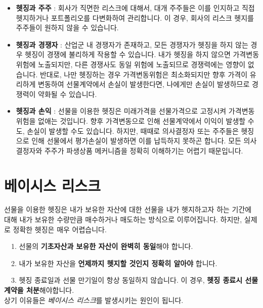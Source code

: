 \documentclass[
  letterpaper,
  DIV=11,
  numbers=noendperiod]{scrreprt}
\begin{document}
\begin{itemize}
\item
  \textbf{헷징과 주주} : 회사가 직면한 리스크에 대해서, 대개 주주들은
  이를 인지하고 직접 헷지하거나 포트폴리오를 다변화하여 관리합니다. 이
  경우, 회사의 리스크 헷지를 주주들이 원하지 않을 수 있습니다.
\item
  \textbf{헷징과 경쟁자} : 산업군 내 경쟁자가 존재하고, 모든 경쟁자가
  헷징을 하지 않는 경우 헷징이 경쟁에 불리하게 작용할 수 있습니다. 내가
  헷징을 하지 않으면 가격변동위험에 노출되지만, 다른 경쟁사도 동일
  위험에 노출되므로 경쟁력에는 영향이 없습니다. 반대로, 나만 헷징하는
  경우 가격변동위험은 최소화되지만 향후 가격이 유리하게 변동하여
  선물계약에서 손실이 발생한다면, 나에게만 손실이 발생하므로 경쟁력이
  약화될 수 있습니다.
\item
  \textbf{헷징과 손익} : 선물을 이용한 헷징은 미래가격을 선물가격으로
  고정시켜 가격변동위험을 없애는 것입니다. 향후 가격변동으로 인해
  선물계약에서 이익이 발생할 수도, 손실이 발생할 수도 있습니다. 하지만,
  때때로 의사결정자 또는 주주들은 헷징으로 인해 선물에서 평가손실이
  발생하면 이를 납득하지 못하곤 합니다. 모든 의사결정자와 주주가
  파생상품 메커니즘을 정확히 이해하기는 어렵기 때문입니다.
\end{itemize}

\section*{베이시스
리스크}\label{uxbca0uxc774uxc2dcuxc2a4-uxb9acuxc2a4uxd06c}


선물을 이용한 헷징은 내가 보유한 자산에 대한 선물을 내가 헷지하고자 하는
기간에 대해 내가 보유한 수량만큼 매수하거나 매도하는 방식으로
이루어집니다. 하지만, 실제로 정확한 헷징은 매우 어렵습니다.\\
\strut ~~1. 선물의 \textbf{기초자산과 보유한 자산이 완벽히 동일}해야
합니다.\\
\strut ~~2. 내가 보유한 자산을 \textbf{언제까지 헷지할 것인지 정확히
알아야} 합니다.\\
\strut ~~3. 헷징 종료일과 선물 만기일이 항상 동일하지 않습니다. 이 경우,
\textbf{헷징 종료시 선물계약을 처분}해야합니다.\\
상기 이유들은 \emph{베이시스 리스크}를 발생시키는 원인이 됩니다.
\end{document}
